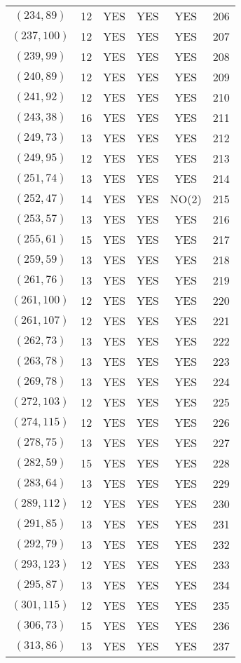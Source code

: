 \begin{longtable}{|c|c|c|c|c|c|}
$(234, 89)$ & 12 & YES & YES & YES & 206\\
$(237, 100)$ & 12 & YES & YES & YES & 207\\
$(239, 99)$ & 12 & YES & YES & YES & 208\\
$(240, 89)$ & 12 & YES & YES & YES & 209\\
$(241, 92)$ & 12 & YES & YES & YES & 210\\
$(243, 38)$ & 16 & YES & YES & YES & 211\\
$(249, 73)$ & 13 & YES & YES & YES & 212\\
$(249, 95)$ & 12 & YES & YES & YES & 213\\
$(251, 74)$ & 13 & YES & YES & YES & 214\\
$(252, 47)$ & 14 & YES & YES & NO(2) & 215\\
$(253, 57)$ & 13 & YES & YES & YES & 216\\
$(255, 61)$ & 15 & YES & YES & YES & 217\\
$(259, 59)$ & 13 & YES & YES & YES & 218\\
$(261, 76)$ & 13 & YES & YES & YES & 219\\
$(261, 100)$ & 12 & YES & YES & YES & 220\\
$(261, 107)$ & 12 & YES & YES & YES & 221\\
$(262, 73)$ & 13 & YES & YES & YES & 222\\
$(263, 78)$ & 13 & YES & YES & YES & 223\\
$(269, 78)$ & 13 & YES & YES & YES & 224\\
$(272, 103)$ & 12 & YES & YES & YES & 225\\
$(274, 115)$ & 12 & YES & YES & YES & 226\\
$(278, 75)$ & 13 & YES & YES & YES & 227\\
$(282, 59)$ & 15 & YES & YES & YES & 228\\
$(283, 64)$ & 13 & YES & YES & YES & 229\\
$(289, 112)$ & 12 & YES & YES & YES & 230\\
$(291, 85)$ & 13 & YES & YES & YES & 231\\
$(292, 79)$ & 13 & YES & YES & YES & 232\\
$(293, 123)$ & 12 & YES & YES & YES & 233\\
$(295, 87)$ & 13 & YES & YES & YES & 234\\
$(301, 115)$ & 12 & YES & YES & YES & 235\\
$(306, 73)$ & 15 & YES & YES & YES & 236\\
$(313, 86)$ & 13 & YES & YES & YES & 237\\

\end{longtable}
